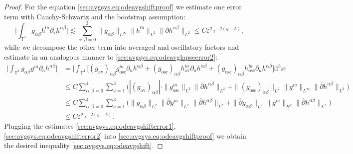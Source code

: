 \documentclass{article}
\newcommand{\TT}{\mathbb{T}}
\newcommand{\osc}{\mathrm{osc}}
\newcommand{\av}{\mathrm{av}}
\newcommand{\de}{\mathrm{d}}
\newcommand{\ol}{\overline}
\newcommand{\lesa}{\lesssim}
\newcommand{\ve}{\varepsilon}
\newcommand{\pa}{\partial}
\begin{document}
\begin{proof}
For the equation \eqref{sec:avgsys.eq:odeavgshiftproof} we estimate one error term with Cauchy-Schwartz and the bootstrap assumption:
\begin{equation}
    \Big|\int_{\TT^3}g_{\alpha\beta} h^{0i}\pa_\tau  h^{\alpha\beta}\Big|\lesa \sum_{\alpha,\beta = 0}^3\|g_{\alpha\beta}\|_{L^\infty}\| h^{0i}\|_{L^2}\|\pa h^{\alpha\beta}\|_{L^2} \leq C \ve^2\tau^{-2(q-\delta)},\label{sec:avgsys.eq:odeavgshifterror1}
\end{equation}
while we decompose the other term into averaged and oscillatory factors and estimate in an analogous manner to \eqref{sec:avgsys.eq:odeavglapseerror2}:
\begin{align}
    \Big|\int_{\TT^3}g_{\alpha\beta} g^{ia}\pa_a  h^{\alpha\beta}\Big| &= \Big|\int_{\TT^3}\Big[(g_{\av})_{\alpha\beta}g_{\osc}^{ia}\pa_a  h^{\alpha\beta} + (g_{\osc})_{\alpha\beta}   h_{\av}^{ia}\pa_a  h^{\alpha\beta} + (g_{\osc})_{\alpha\beta} h_{\osc}^{ia}\pa_a  h^{\alpha\beta}\Big]\de^3 x\Big|\nonumber\\
    &\leq C\sum_{\alpha,\beta=0}^4\sum_{a=1}^3\Big(|(g_{\av})_{\alpha\beta}|\cdot\|g_{\osc}^{ia}\|_{L^2}\|\ol{\pa}  h^{\alpha\beta}\|_{L^2} + \|(g_{\osc})_{\alpha\beta}\|_{L^2}\|g^{ia}\|_{L^\infty}\|\ol{\pa}  h^{\alpha\beta}\|_{L^2}\Big)\nonumber\\
    &\leq C \sum_{\alpha,\beta=0}^4\sum_{a=1}^3\Big(\|g_{\alpha\beta}\|_{L^2}\|\ol{\pa} g^{ia}\|_{L^2}\|\ol{\pa}  h^{\alpha\beta}\|_{L^2} + \|\ol{\pa} g_{\alpha\beta}\|_{L^2}\|g^{ia}\|_{H^2}\|\ol{\pa}  h^{\alpha\beta}\|_{L^2}\Big)\nonumber\\
    &\leq C \ve^2\tau^{-2(q-\delta)}.\label{sec:avgsys.eq:odeavgshifterror2}
\end{align}
Plugging the estimates \eqref{sec:avgsys.eq:odeavgshifterror1}, \eqref{sec:avgsys.eq:odeavgshifterror2} into \eqref{sec:avgsys.eq:odeavgshiftproof} we obtain the desired inequality \eqref{sec:avgsys.eq:odeavgshift}.
\end{proof}
\end{document}
